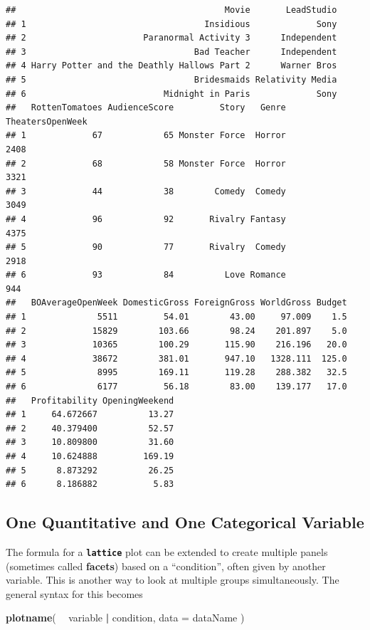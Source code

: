 \documentclass[]{book}
\newenvironment{Shaded}{\begin{snugshade}}{\end{snugshade}}
\newcommand{\DataTypeTok}[1]{\textcolor[rgb]{0.13,0.29,0.53}{#1}}
\newcommand{\KeywordTok}[1]{\textcolor[rgb]{0.13,0.29,0.53}{\textbf{#1}}}
\newcommand{\NormalTok}[1]{#1}
\newcommand{\OperatorTok}[1]{\textcolor[rgb]{0.81,0.36,0.00}{\textbf{#1}}}
\newcommand{\StringTok}[1]{\textcolor[rgb]{0.31,0.60,0.02}{#1}}
\begin{document}
\begin{verbatim}
##                                         Movie       LeadStudio
## 1                                   Insidious             Sony
## 2                       Paranormal Activity 3      Independent
## 3                                 Bad Teacher      Independent
## 4 Harry Potter and the Deathly Hallows Part 2      Warner Bros
## 5                                 Bridesmaids Relativity Media
## 6                           Midnight in Paris             Sony
##   RottenTomatoes AudienceScore         Story   Genre TheatersOpenWeek
## 1             67            65 Monster Force  Horror             2408
## 2             68            58 Monster Force  Horror             3321
## 3             44            38        Comedy  Comedy             3049
## 4             96            92       Rivalry Fantasy             4375
## 5             90            77       Rivalry  Comedy             2918
## 6             93            84          Love Romance              944
##   BOAverageOpenWeek DomesticGross ForeignGross WorldGross Budget
## 1              5511         54.01        43.00     97.009    1.5
## 2             15829        103.66        98.24    201.897    5.0
## 3             10365        100.29       115.90    216.196   20.0
## 4             38672        381.01       947.10   1328.111  125.0
## 5              8995        169.11       119.28    288.382   32.5
## 6              6177         56.18        83.00    139.177   17.0
##   Profitability OpeningWeekend
## 1     64.672667          13.27
## 2     40.379400          52.57
## 3     10.809800          31.60
## 4     10.624888         169.19
## 5      8.873292          26.25
## 6      8.186882           5.83
\end{verbatim}

\hypertarget{one-quantitative-and-one-categorical-variable}{%
\subsection{One Quantitative and One Categorical Variable}\label{one-quantitative-and-one-categorical-variable}}

The formula for a \textbf{\texttt{lattice}} plot can be extended to create multiple panels (sometimes called \textbf{facets}) based on a ``condition'', often given by another variable. This is another way to look at multiple groups simultaneously. The general syntax for this becomes

\begin{Shaded}
\begin{Highlighting}[]
\KeywordTok{plotname}\NormalTok{( }\OperatorTok{~}\StringTok{ }\NormalTok{variable }\OperatorTok{|}\StringTok{ }\NormalTok{condition, }\DataTypeTok{data =}\NormalTok{ dataName )}
\end{Highlighting}
\end{Shaded}
\end{document}
